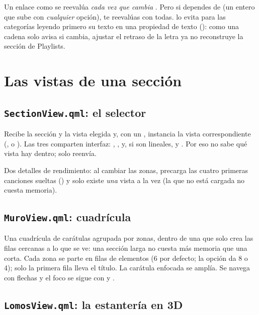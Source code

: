 \begin{trampa}
Un enlace como  se reevalúa \emph{cada vez
que cambia} . Pero si dependes de  (un entero
que sube con \emph{cualquier} opción), te reevalúas con todas.  lo evita para las
categorías leyendo primero su texto en una propiedad de texto (): como una
cadena solo avisa si cambia, ajustar el retraso de la letra ya no reconstruye la sección de
Playlists.
\end{trampa}

\section{Las vistas de una sección}

\subsection{\texttt{SectionView.qml}: el selector}

Recibe la sección y la vista elegida y, con un , instancia la vista
correspondiente (,  o ). Las tres comparten
interfaz: , ,  y, si son lineales, 
y . Por eso  no sabe qué vista hay dentro; solo reenvía.

Dos detalles de rendimiento: al cambiar las zonas, precarga las cuatro primeras canciones
sueltas () y solo existe \emph{una} vista a la vez (la que no está
cargada no cuesta memoria).

\subsection{\texttt{MuroView.qml}: cuadrícula}

Una cuadrícula de carátulas agrupada por zonas, dentro de una  que solo crea las
filas cercanas a lo que se ve: una sección larga no cuesta más memoria que una corta. Cada zona se parte en filas de 
elementos (6 por defecto; la opción  da 8 o 4); solo la primera fila lleva el
título. La carátula enfocada se amplía. Se navega con flechas y el foco se sigue con
 y .

\subsection{\texttt{LomosView.qml}: la estantería en 3D}

